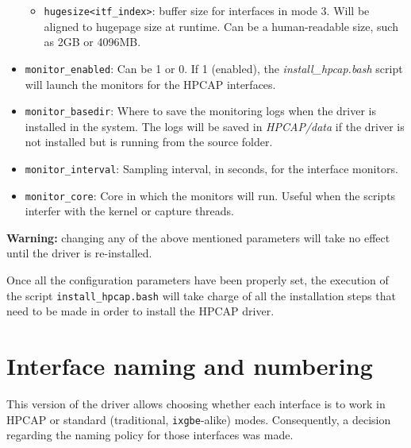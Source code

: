 \documentclass[a4paper,oneside]{hpman}
\begin{document}
\begin{itemize}
\begin{itemize}
        \item \texttt{hugesize<itf\_index>}: buffer size for interfaces in mode 3. Will be aligned to hugepage size at runtime. Can be a human-readable size, such as 2GB or 4096MB.


    \end{itemize}

    \item \texttt{monitor\_enabled}: Can be 1 or 0. If 1 (enabled), the \textit{install\_hpcap.bash} script will launch the monitors for the HPCAP interfaces.

    \item \texttt{monitor\_basedir}: Where to save the monitoring logs when the driver is installed in the system. The logs will be saved in \textit{HPCAP/data} if the driver is not installed but is running from the source folder.

    \item \texttt{monitor\_interval}: Sampling interval, in seconds, for the interface monitors.

    \item \texttt{monitor\_core}: Core in which the monitors will run. Useful when the scripts interfer with the kernel or capture threads.
\end{itemize}

\textbf{Warning:} changing any of the above mentioned parameters will take no effect until the driver is re-installed.

Once all the configuration parameters have been properly set, the execution of the script \texttt{install\_hpcap.bash} will take charge of all the installation steps that need to be made in order to install the HPCAP driver.

\section{Interface naming and numbering}
\label{sec:InterfaceNaming}

This version of the driver allows choosing whether each interface is to work in HPCAP or standard (traditional, \texttt{ixgbe}-alike) modes. Consequently, a decision regarding the naming policy for those interfaces was made.
\end{document}
